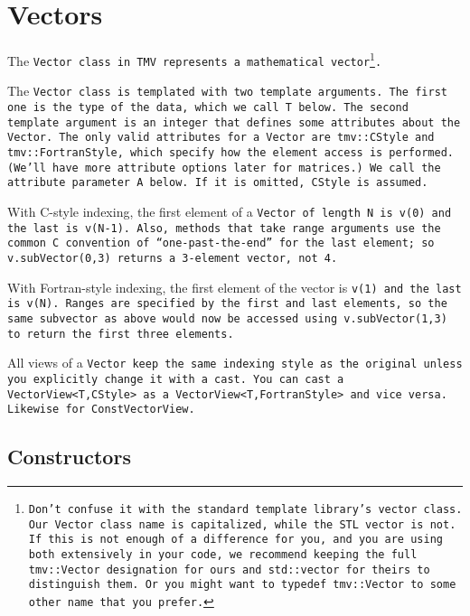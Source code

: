 
\section{Vectors}
\label{Vector}

The \tt{Vector} class in TMV represents a mathematical vector\footnote{Don't confuse it with
the standard template library's \tt{vector} class.
Our \tt{Vector} class name is capitalized, while the STL \tt{vector} is not.
If this is not enough of a difference for you, and you are using both extensively in your code,
we recommend keeping the full \tt{tmv::Vector} designation for ours and \tt{std::vector}
for theirs to distinguish them.  Or you might want to \tt{typedef tmv::Vector} to some other name that you prefer.}.

The \tt{Vector} class is templated with two template arguments.  The first one is the type of
the data, which we call \tt{T} below.
The second template argument is an integer that defines some attributes about the \tt{Vector}.
The only valid attributes for a \tt{Vector}
are \tt{tmv::CStyle} and \tt{tmv::FortranStyle}, which specify how the element
access is performed.  (We'll have more attribute options later for
matrices.)  We call the attribute parameter \tt{A} below.  If it is omitted, \tt{CStyle} is assumed.  

With C-style indexing, the first element of a \tt{Vector} of length \tt{N} is 
\tt{v(0)} and the last is \tt{v(N-1)}.  Also, methods that take range arguments
use the common C convention of ``one-past-the-end'' for the last element;
so \tt{v.subVector(0,3)} returns a 3-element vector, not 4.

With Fortran-style indexing, the first element of the vector is \tt{v(1)} and the 
last is \tt{v(N)}.  Ranges are specified by the first and last elements, so the same
subvector as above would now be accessed using \tt{v.subVector(1,3)} to return
the first three elements.

All views of a \tt{Vector} keep the same indexing style as the original unless you
explicitly change it with a cast.  You can cast a \tt{VectorView<T,CStyle>} as
a \tt{VectorView<T,FortranStyle>} and vice versa.  Likewise for
\tt{ConstVectorView}.  

\subsection{Constructors}
\label{Vector_Constructors}

